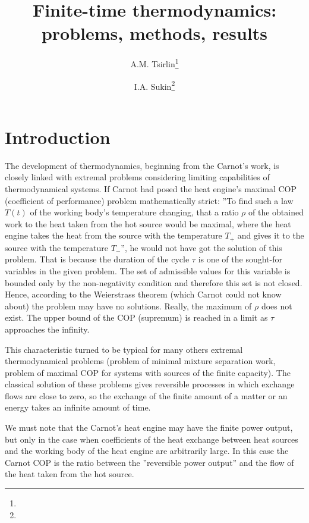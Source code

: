 \documentclass[epjST]{svjour}
\begin{document}
%
\title{Finite-time thermodynamics: problems, methods, results}
\author{A.M. Tsirlin\fnmsep\thanks{} \and I.A. Sukin\fnmsep\thanks{} }
%
%
%
\maketitle
%
\section{Introduction}
\label{intro}
The development of thermodynamics, beginning from the Carnot’s work, is closely linked with extremal problems considering limiting capabilities of thermodynamical systems. If Carnot had posed the heat engine’s maximal COP (coefficient of performance) problem mathematically strict: ''To find such a law $T(t)$ of the working body’s temperature changing, that a ratio $\rho$ of the obtained work to the heat taken from the hot source would be maximal, where the heat engine takes the heat from the source with the temperature $T_+$ and gives it to the source with the temperature $T_-$'', he would not have got the solution of this problem. That is because the duration of the cycle $\tau$ is one of the sought-for variables in the given problem. The set of admissible values for this variable is bounded only by the non-negativity condition and therefore this set is not closed. Hence, according to the Weierstrass theorem (which Carnot could not know about) the problem may have no solutions. Really, the maximum of $\rho$ does not exist. The upper bound of the COP (supremum) is reached in a limit as $\tau$ approaches the infinity.

This characteristic turned to be typical for many others extremal thermodynamical problems (problem of minimal mixture separation work, problem of maximal COP for systems with sources of the finite capacity). The classical solution of these problems gives reversible processes in which exchange flows are close to zero, so the exchange of the finite amount of a matter or an energy takes an infinite amount of time.

We must note that the Carnot's heat engine may have the finite power output, but only in the case when coefficients of the heat exchange between heat sources and the working body of the heat engine are arbitrarily large. In this case the Carnot COP is the ratio between the ''reversible power output'' and the flow of the heat taken from the hot source.
\end{document}
